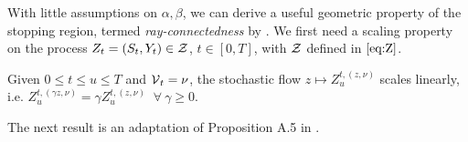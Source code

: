   With little assumptions on $\alpha,\beta$, we can derive a useful geometric property of the stopping region, termed \textit{ray-connectedness} by  \citet{BroadieDetemple}. %
We first need a scaling property on the  process  $Z_t = (S_t,Y_t) \in \operatorname{\mathcal{Z}}$, $t\in[0,T]$,  with $\operatorname{\mathcal{Z}}$ defined in $\eqref{eq:Z}$. 


\begin{asm} \label{asm:scale}
    Given $0\le t \le u \le T$ and $\operatorname{\mathcal{V}}_t = \nu$, the stochastic flow $z \mapsto Z_u^{t,(z,\nu)}$  scales  linearly, i.e. 
    $Z_u^{t,(\gamma z,\nu)} = \gamma Z_u^{t,(z,\nu)}$ $\ \forall \ \gamma \ge 0$.
\end{asm}


The next result is an adaptation of  Proposition A.5 in  \cite{BroadieDetemple}. 

